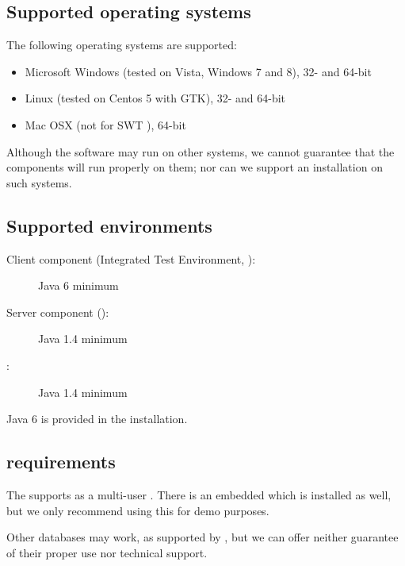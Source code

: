 
\subsection{Supported operating systems}
The following operating systems are supported:
\begin{itemize}
  \item Microsoft Windows (tested on Vista, Windows 7 and 8), 32- and 64-bit
  \item  Linux (tested on Centos 5 with GTK), 32- and 64-bit
  \item Mac OSX (not for SWT \gdauts{}), 64-bit 

\end{itemize}

Although the software may run on other systems, we cannot guarantee that the components will run properly on them; nor can we support an installation on such systems.

\subsection{Supported  environments}
\begin{description}
\item [Client component (Integrated Test Environment, \ite{}):]{Java 6 minimum}
\item [Server component (\gdagent):]{Java 1.4 minimum}
\item [\gdaut{}:]{Java 1.4 minimum}
\end{description}
Java 6 is provided in the  installation.  

 

\subsection{\gdDB requirements}
The \ite{} supports   as a multi-user \gddb{}. There is an embedded \gddb{} which is installed as well, but we only recommend using this for demo purposes. 

Other databases may work, as supported by , but we can offer neither guarantee of their proper use nor technical support. 


